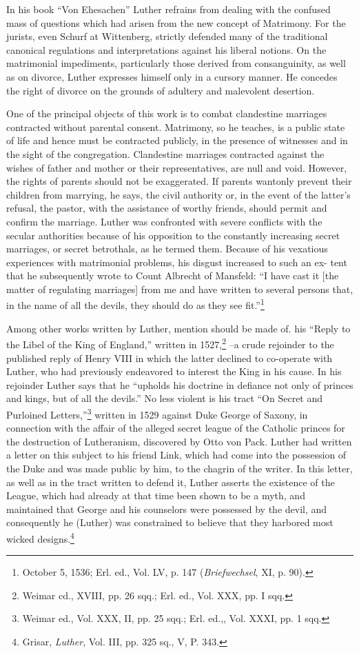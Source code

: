 In his book “Von Ehesachen” Luther refrains from dealing with the
confused mass of questions which had arisen from the new concept
of Matrimony. For the jurists, even Schurf at Wittenberg, strictly defended
many of the traditional canonical regulations and interpretations against
his liberal notions. On the matrimonial impediments,
particularly those derived from consanguinity, as well as on divorce,
Luther expresses himself only in a cursory manner. He concedes
the right of divorce on the grounds of adultery and malevolent desertion.

One of the principal objects of this work is to combat clandestine
marriages contracted without parental consent. Matrimony, so he
teaches, is a public state of life and hence must be contracted publicly,
in the presence of witnesses and in the sight of the congregation.
Clandestine marriages contracted against the wishes of father and
mother or their representatives, are null and void. However, the
rights of parents should not be exaggerated. If parents wantonly prevent
their children from marrying, he says, the civil authority or, in
the event of the latter’s refusal, the pastor, with the assistance of
worthy friends, should permit and confirm the marriage. Luther was
confronted with severe conflicts with the secular authorities because
of his opposition to the constantly increasing secret marriages, or
secret betrothals, as he termed them. Because of his vexatious experiences
with matrimonial problems, his disgust increased to such an ex-
tent that he subsequently wrote to Count Albrecht of Mansfeld:
“I have cast it [the matter of regulating marriages] from me and have
written to several persons that, in the name of all the devils, they
should do as they see fit.”\footnote{October 5, 1536; Erl. ed., Vol. LV, p. 147 (\textit{Briefwechsel}, XI, p. 90).}

Among other works written by Luther, mention should be made of.
his “Reply to the Libel of the King of England,” written in 1527,\footnote{Weimar cd., XVIII, pp. 26 sqq.; Erl. ed., Vol. XXX, pp. I sqq.}
--a crude rejoinder to the published reply of Henry VIII in which
the latter declined to co-operate with Luther, who had previously endeavored
to interest the King in his cause. In his rejoinder Luther says
that he “upholds his doctrine in defiance not only of princes and
kings, but of all the devils.” No less violent is his tract “On Secret and
Purloined Letters,”\footnote{Weimar ed., Vol. XXX, II, pp. 25 sqq.; Erl. ed.,, Vol. XXXI, pp. 1 sqq.}
 written in 1529 against Duke George of Saxony,
in connection with the affair of the alleged secret league of the Catholic
princes for the destruction of Lutheranism, discovered by Otto
von Pack. Luther had written a letter on this subject to his friend
Link, which had come into the possession of the Duke and was made
public by him, to the chagrin of the writer. In this letter, as well as
in the tract written to defend it, Luther asserts the existence of the
League, which had already at that time been shown to be a myth, and
maintained that George and his counselors were possessed by the devil,
and consequently he (Luther) was constrained to believe that they
harbored most wicked designs.\footnote{Grisar, \textit{Luther}, Vol. III, pp. 325 sq., V, P. 343.}

